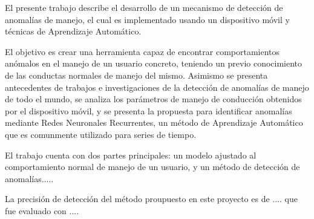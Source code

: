 El presente trabajo describe el desarrollo de un mecanismo de detecci\'{o}n de anomal\'{i}as de manejo, el cual es implementado usando un dispositivo m\'{o}vil y t\'{e}cnicas de Aprendizaje Autom\'{a}tico. 

El objetivo es crear una herramienta capaz de encontrar comportamientos an\'{o}malos en el manejo de un usuario concreto, teniendo un previo conocimiento de las conductas normales de manejo del mismo. Asimismo se presenta antecedentes de trabajos e investigaciones de la detecci\'{o}n de anomal\'{i}as de manejo de todo el mundo, se analiza los par\'{a}metros de manejo de conducci\'{o}n obtenidos por el dispositivo m\'{o}vil, y se presenta la propuesta para identificar anomal\'{i}as mediante Redes Neuronales Recurrentes, un m\'{e}todo de Aprendizaje Autom\'{a}tico que es comunmente utilizado para series de tiempo.

El trabajo cuenta con dos partes principales: un modelo ajustado al comportamiento normal de manejo de un usuario, y un m\'{e}todo de detecci\'{o}n de anomal\'{i}as.....

La precisi\'{o}n de detecci\'{o}n del m\'{e}todo proupuesto en este proyecto es de .... que fue evaluado con .... 





